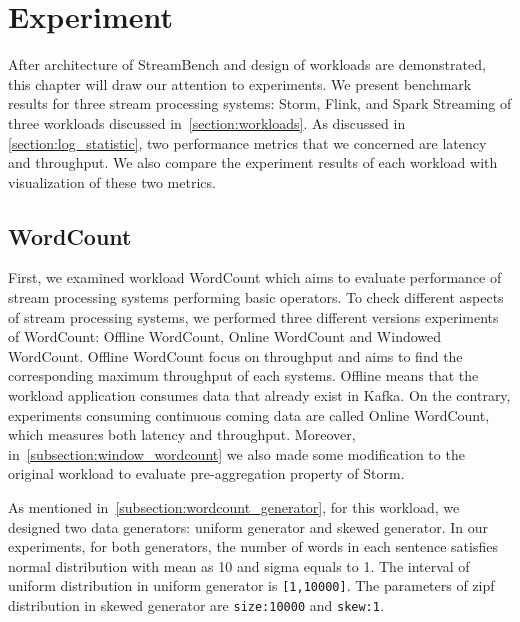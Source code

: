 \chapter{Experiment}
\label{chapter:experiment}

After architecture of StreamBench and design of workloads are demonstrated, this chapter will draw our attention to experiments. We present benchmark results for three stream processing systems: Storm, Flink, and Spark Streaming of three workloads discussed in~\cref{section:workloads}. As discussed in \cref{section:log_statistic}, two performance metrics that we concerned are latency and throughput. We also compare the experiment results of each workload with visualization of these two metrics. 

\section{WordCount}
First, we examined workload WordCount which aims to evaluate performance of stream processing systems performing basic operators. To check different aspects of stream processing systems, we performed three different versions experiments of WordCount: Offline WordCount, Online WordCount and Windowed WordCount. Offline WordCount focus on throughput and aims to find the corresponding maximum throughput of each systems. Offline means that the workload application consumes data that already exist in Kafka. On the contrary, experiments consuming continuous coming data are called Online WordCount, which measures both latency and throughput. Moreover, in~\cref{subsection:window_wordcount} we also made some modification to the original workload to evaluate pre-aggregation property of Storm. 


As mentioned in~\cref{subsection:wordcount_generator}, for this workload, we designed two data generators: uniform generator and skewed generator. In our experiments, for both generators, the number of words in each sentence satisfies normal distribution with mean as 10 and sigma equals to 1. The interval of uniform distribution in uniform generator is \texttt{[1,10000]}.  The parameters of zipf distribution in skewed generator are \texttt{size:10000} and \texttt{skew:1}.


